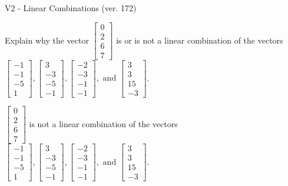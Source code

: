 \begin{exercise}
  \begin{exerciseTitle}V2 - Linear Combinations (ver. 172)\end{exerciseTitle}
  \begin{exerciseStatement}
    Explain why the vector \(\left[\begin{array}{c}
0 \\
2 \\
6 \\
7
\end{array}\right]\)  is or is not a linear 
	combination of the vectors \(\left[\begin{array}{c}
-1 \\
-1 \\
-5 \\
1
\end{array}\right] , \left[\begin{array}{c}
3 \\
-3 \\
-5 \\
-1
\end{array}\right] , \left[\begin{array}{c}
-2 \\
-3 \\
-1 \\
-1
\end{array}\right] , \text{ and } \left[\begin{array}{c}
3 \\
3 \\
15 \\
-3
\end{array}\right]\).
	


  \end{exerciseStatement}
  \begin{exerciseAnswer}
   \(\left[\begin{array}{c}
0 \\
2 \\
6 \\
7
\end{array}\right]\) 
  	 is not  
	a linear combination of the vectors \(\left[\begin{array}{c}
-1 \\
-1 \\
-5 \\
1
\end{array}\right] , \left[\begin{array}{c}
3 \\
-3 \\
-5 \\
-1
\end{array}\right] , \left[\begin{array}{c}
-2 \\
-3 \\
-1 \\
-1
\end{array}\right] , \text{ and } \left[\begin{array}{c}
3 \\
3 \\
15 \\
-3
\end{array}\right]\).


\end{exerciseAnswer}
\end{exercise}
